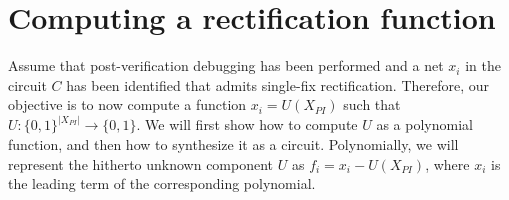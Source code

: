 \section{Computing a rectification function}\label{rect}




Assume that post-verification debugging has been performed and a net
$x_i$ in the circuit $C$ has been identified that admits single-fix
rectification. Therefore, our objective is to now compute a function
$x_i = U(X_{PI})$ such that $U: \{0,1\}^{|X_{PI}|}\rightarrow
\{0,1\}$. We will first show how to compute $U$ as a polynomial
function, and then how to synthesize it as a circuit. Polynomially, we
will represent the hitherto unknown component $U$ as $f_i = x_i -
U(X_{PI})$, where $x_i$ is the leading term of the corresponding
polynomial. 




